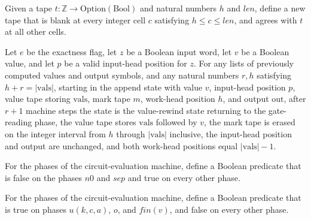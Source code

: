 \begin{definition}
\label{BoolCircuit.CircuitEval.Internal.erase}
\leanok
Given a tape $t:\mathbb{Z}\to\mathrm{Option}(\mathrm{Bool})$ and natural numbers $h$ and
$len$, define a new tape that is blank at every integer cell $c$ satisfying $h\le c\le
len$, and agrees with $t$ at all other cells.
\end{definition}

\begin{theorem}
\label{BoolCircuit.CircuitEval.app_walk}
\leanok
{}
Let $e$ be the exactness flag, let $z$ be a Boolean input word, let $v$ be a Boolean
value, and let $p$ be a valid input-head position for $z$. For any lists of previously
computed values and output symbols, and any natural numbers $r,h$ satisfying
$h+r=|\mathrm{vals}|$, starting in the append state with value $v$, input-head position
$p$, value tape storing $\mathrm{vals}$, mark tape $m$, work-head position $h$, and
output $\mathrm{out}$, after $r+1$ machine steps the state is the value-rewind state
returning to the gate-reading phase, the value tape stores $\mathrm{vals}$ followed by
$v$, the mark tape is erased on the integer interval from $h$ through $|\mathrm{vals}|$
inclusive, the input-head position and output are unchanged, and both work-head
positions equal $|\mathrm{vals}|-1$.
\end{theorem}

\begin{definition}
\label{BoolCircuit.CircuitEval.Internal.main}
\leanok
{}
For the phases of the circuit-evaluation machine, define a Boolean predicate that is
false on the phases $n0$ and $sep$ and true on every other phase.
\end{definition}

\begin{definition}
\label{BoolCircuit.CircuitEval.Internal.walk}
\leanok
{}
For the phases of the circuit-evaluation machine, define a Boolean predicate that is
true on phases $u(k,c,a)$, $o$, and $fin(v)$, and false on every other phase.
\end{definition}

